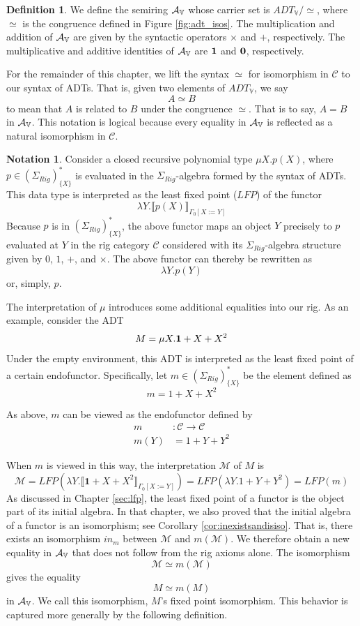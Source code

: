 \documentclass{msthesis}
\theoremstyle{definition}
\newtheorem{definition}[theorem]{Definition}
\newtheorem*{notation}{Notation}
\newcommand{\semof}[1]{\llbracket{#1}\rrbracket}
\newcommand{\mcC}{\mathcal{C}}
\newcommand{\vars}{\mathbb{V}}
\begin{document}
\begin{definition}
    We define the semiring $\ADTrig$ whose carrier set is $ADT_\vars/\simeq$, where $\simeq$ is the congruence defined in Figure \ref{fig:adt_isos}.  The multiplication and addition of $\ADTrig$ are given by the syntactic operators $\times$ and $+$, respectively.  The multiplicative and additive identities of $\ADTrig$ are $\mathbf{1}$ and $\mathbf{0}$, respectively.
\end{definition}

For the remainder of this chapter, we lift the syntax $\simeq$ for isomorphism in $\mcC$ to our syntax of ADTs.  That is, given two elements of $ADT_{\vars}$, we say
\[ A \simeq B \]
to mean that $A$ is related to $B$ under the congruence $\simeq$.  That is to say, $A = B$ in $\ADTrig$.  This notation is logical because every equality in $\ADTrig$ is reflected as a natural isomorphism in $\mcC$.

\begin{notation}
    Consider a closed recursive polynomial type $\mu X.p(X)$, where $p \in (\Sigma_{Rig})^*_{\{X\}}$ is evaluated in the $\Sigma_{Rig}$-algebra formed by the syntax of ADTs. This data type is interpreted as the least fixed point ($LFP$) of the functor
    \[ \lambda Y. \semof{p(X)}_{\Gamma_0[X := Y]} \]
    Because $p$ is in $(\Sigma_{Rig})^*_{\{X\}}$, the above functor maps an object $Y$ precisely to $p$ evaluated at $Y$ in the rig category $\mcC$ considered with its $\Sigma_{Rig}$-algebra structure given by $0$, $1$, $+$, and $\times$.  The above functor can thereby be rewritten as
    \[ \lambda Y.p(Y)\]
    or, simply, $p$.
\end{notation}

The interpretation of $\mu$ introduces some additional equalities into our rig.  As an example, consider the ADT
\[ M = \mu X.\mathbf{1} + X + X^2\]
Under the empty environment, this ADT is interpreted as the least fixed point of a certain endofunctor.  Specifically, let $m \in (\Sigma_{Rig})^*_{\{X\}}$ be the element defined as
\[ m = 1 + X + X^2\]

As above, $m$ can be viewed as the endofunctor defined by
\begin{align*}
    m &: \mcC \to \mcC \\
    m(Y) &= 1 + Y + Y^2
\end{align*}

When $m$ is viewed in this way, the interpretation $\mathcal{M}$ of $M$ is
\[ \mathcal{M} = LFP(\lambda Y. \semof{\mathbf{1} + X + X^2}_{\Gamma_0[X := Y]}) = LFP(\lambda Y.1 + Y + Y^2) = LFP(m)\]
As discussed in Chapter \ref{sec:lfp}, the least fixed point of a functor is the object part of its initial algebra.  In that chapter, we also proved that the initial algebra of a functor is an isomorphism; see Corollary \ref{cor:inexistsandisiso}.  That is, there exists an isomorphism $in_m$ between $\mathcal{M}$ and $m(\mathcal{M})$.  We therefore obtain a new equality in $\ADTrig$ that does not follow from the rig axioms alone.  The isomorphism
\[ \mathcal{M} \simeq m(\mathcal{M}) \]
gives the equality
\[ M \simeq m(M)\]
in $\ADTrig$.  We call this isomorphism, $M$'s fixed point isomorphism.  This behavior is captured more generally by the following definition.
\end{document}
